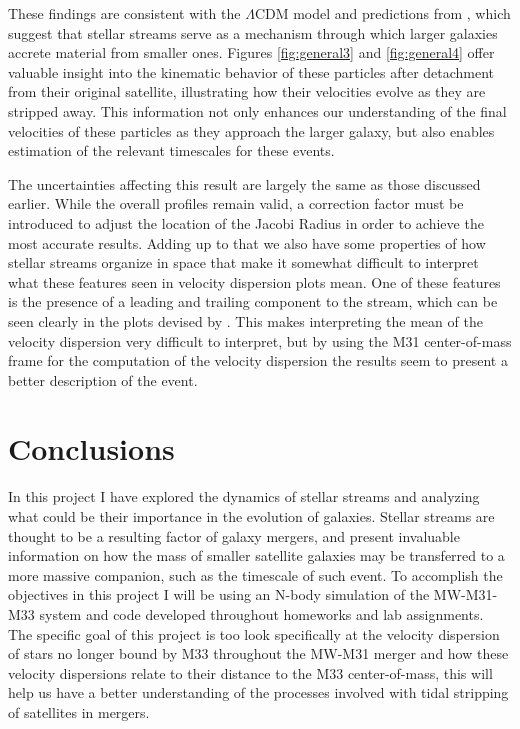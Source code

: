 \documentclass[linenumbers,trackchanges,twocolumn]{aastex7}
\begin{document}
These findings are consistent with the $\Lambda$CDM model and predictions from \cite{Jensen2021-mw}, which suggest that stellar streams serve as a mechanism through which larger galaxies accrete material from smaller ones. Figures \ref{fig:general3} and \ref{fig:general4} offer valuable insight into the kinematic behavior of these particles after detachment from their original satellite, illustrating how their velocities evolve as they are stripped away. This information not only enhances our understanding of the final velocities of these particles as they approach the larger galaxy, but also enables estimation of the relevant timescales for these events.

The uncertainties affecting this result are largely the same as those discussed earlier. While the overall profiles remain valid, a correction factor must be introduced to adjust the location of the Jacobi Radius in order to achieve the most accurate results. Adding up to that we also have some properties of how stellar streams organize in space that make it somewhat difficult to interpret what these features seen in velocity dispersion plots mean. One of these features is the presence of a leading and trailing component to the stream, which can be seen clearly in the plots devised by \cite{Choi2007-lc}. This makes interpreting the mean of the velocity dispersion very difficult to interpret, but by using the M31 center-of-mass frame for the computation of the velocity dispersion the results seem to present a better description of the event.

\section{Conclusions}\label{sec:conclusions}

In this project I have explored the dynamics of stellar streams and analyzing what could be their importance in the evolution of galaxies. Stellar streams are thought to be a resulting factor of galaxy mergers, and present invaluable information on how the mass of smaller satellite galaxies may be transferred to a more massive companion, such as the timescale of such event. To accomplish the objectives in this project I will be using an N-body simulation of the MW-M31-M33 system and code developed throughout homeworks and lab assignments. The specific goal of this project is too look specifically at the velocity dispersion of stars no longer bound by M33 throughout the MW-M31 merger and how these velocity dispersions relate to their distance to the M33 center-of-mass, this will help us have a better understanding of the processes involved with tidal stripping of satellites in mergers.
\end{document}
